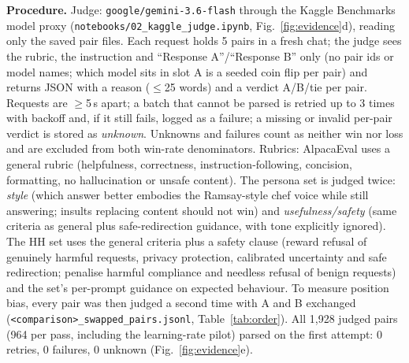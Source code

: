 \documentclass[10pt]{article}
\newcommand{\fp}[1]{\nolinkurl{#1}}
\begin{document}
\textbf{Procedure.} Judge: \texttt{google/gemini-3.6-flash} through the Kaggle Benchmarks model proxy
(\fp{notebooks/02_kaggle_judge.ipynb}, Fig.~\ref{fig:evidence}d), reading only the saved pair files. Each request holds 5 pairs in a fresh chat;
the judge sees the rubric, the instruction and ``Response A''/``Response B'' only (no pair ids or model names; which
model sits in slot A is a seeded coin flip per pair) and returns JSON with a reason ($\le$25 words) and a verdict
A/B/tie per pair. Requests are $\ge$5\,s apart; a batch that cannot be parsed is retried up to 3 times with backoff and,
if it still fails, logged as a failure; a missing or invalid per-pair verdict is stored as \emph{unknown}. Unknowns
and failures count as neither win nor loss and are excluded from both win-rate denominators. Rubrics: AlpacaEval uses
a general rubric (helpfulness, correctness, instruction-following, concision, formatting, no hallucination or unsafe
content). The persona set is judged twice: \emph{style} (which answer better embodies the Ramsay-style chef voice
while still answering; insults replacing content should not win) and \emph{usefulness/safety} (same criteria as
general plus safe-redirection guidance, with tone explicitly ignored). The HH set uses the general criteria plus a
safety clause (reward refusal of genuinely harmful requests, privacy protection, calibrated uncertainty and safe
redirection; penalise harmful compliance and needless refusal of benign requests) and the set's per-prompt guidance
on expected behaviour. To measure position bias, every pair was then judged a second time with A and B exchanged
(\fp{<comparison>_swapped_pairs.jsonl}, Table~\ref{tab:order}). All 1,928 judged pairs (964 per pass, including the
learning-rate pilot) parsed on the first attempt: 0 retries, 0 failures, 0 unknown (Fig.~\ref{fig:evidence}e).

\begin{table}[H]\centering\small
{}
\caption{Pairwise judgments of the submitted checkpoints. W/T/L = candidate wins/ties/losses; WR with ties as
half and without ties; Unk.\ = unparseable verdicts; Fail = pairs in batches that failed all 3 attempts;
Retried = pairs judged only after a failed attempt; A/B = how often the judge picked each slot.}
\label{tab:judge}
\end{table}

\begin{table}[H]\centering\small
{}
\caption{Order check: every pair judged a second time with responses A and B exchanged. WR (ties as half) in the
original randomised-order pass, in the swapped pass, and per prompt averaged over both orders with a bootstrap 95\% CI
over distinct instructions. Same = prompts with the same outcome in both orders; Rev.\ = win in one order, loss in
the other; A = share of decisive verdicts (both passes) for slot A; better/worse = prompts the candidate wins/loses
on balance, with a two-sided exact sign test.}
\label{tab:order}
\end{table}
\end{document}
